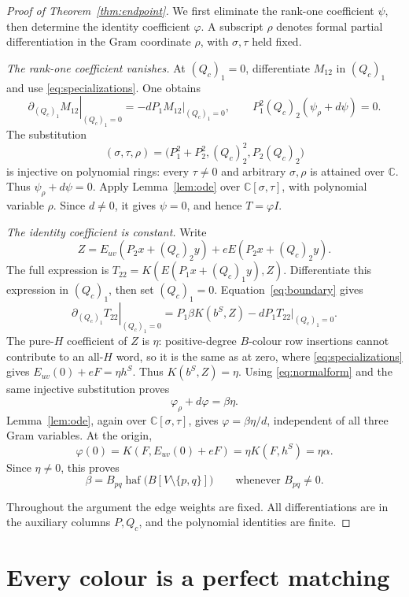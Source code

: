 \documentclass[11pt]{article}
\theoremstyle{definition}
\theoremstyle{plain}
\numberwithin{equation}{section}
\begin{document}
\begin{proof}[Proof of Theorem~\ref{thm:endpoint}]
We first eliminate the rank-one coefficient \(\psi\), then determine the
identity coefficient \(\varphi\). A subscript \(\rho\) denotes formal
partial differentiation in the Gram coordinate \(\rho\), with
\(\sigma,\tau\) held fixed.

\emph{The rank-one coefficient vanishes.}
At \((Q_c)_1=0\), differentiate \(M_{12}\) in \((Q_c)_1\) and use
\eqref{eq:specializations}. One obtains
\[
 \left.\partial_{(Q_c)_1}M_{12}\right|_{(Q_c)_1=0}
       =-dP_1\left.M_{12}\right|_{(Q_c)_1=0},
 \qquad P_1^2(Q_c)_2(\psi_\rho+d\psi)=0.
\]
The substitution
\[
 (\sigma,\tau,\rho)=\bigl(P_1^2+P_2^2,(Q_c)_2^2,P_2(Q_c)_2\bigr)
\]
is injective on polynomial rings: every \(\tau\ne0\) and arbitrary
\(\sigma,\rho\) is attained over \(\mathbb C\). Thus \(\psi_\rho+d\psi=0\).
Apply Lemma~\ref{lem:ode} over \(\mathbb C[\sigma,\tau]\), with polynomial
variable \(\rho\). Since \(d\ne0\), it gives \(\psi=0\), and hence \(T=\varphi I\).

\emph{The identity coefficient is constant.}
Write
\[
 Z=E_{uv}(P_2x+(Q_c)_2y)+eE(P_2x+(Q_c)_2y).
\]
The full expression is \(T_{22}=K(E(P_1x+(Q_c)_1y),Z)\). Differentiate
this expression in \((Q_c)_1\), then set \((Q_c)_1=0\).
Equation~\eqref{eq:boundary} gives
\[
 \left.\partial_{(Q_c)_1}T_{22}\right|_{(Q_c)_1=0}
 =P_1\beta K(b^S,Z)-dP_1\left.T_{22}\right|_{(Q_c)_1=0}.
\]
The pure-\(H\) coefficient of \(Z\) is \(\eta\): positive-degree \(B\)-colour row
insertions cannot contribute to an all-\(H\) word, so it is the same as
at zero, where \eqref{eq:specializations} gives
\(E_{uv}(0)+eF=\eta h^S\). Thus \(K(b^S,Z)=\eta\). Using
\eqref{eq:normalform} and the same injective substitution proves
\[
 \varphi_\rho+d\varphi=\beta\eta.
\]
Lemma~\ref{lem:ode}, again over \(\mathbb C[\sigma,\tau]\), gives
\(\varphi=\beta\eta/d\), independent of all three Gram variables. At the origin,
\[
 \varphi(0)=K(F,E_{uv}(0)+eF)=\eta K(F,h^S)=\eta\alpha.
\]
Since \(\eta\ne0\), this proves
\begin{equation}
 \beta=B_{pq}\operatorname{haf}\bigl(B[V\setminus\{p,q\}]\bigr)
 \qquad\text{whenever }B_{pq}\ne0.
 \tag{10}\label{eq:endpoint}
\end{equation}

Throughout the argument the edge weights are fixed. All differentiations are
in the auxiliary columns \(P,Q_c\), and the polynomial identities are finite.
\end{proof}

\section{Every colour is a perfect matching}\label{sec:matching}
\end{document}
